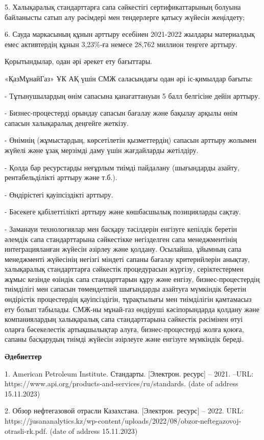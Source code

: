 5. Халықаралық стандарттарға сапа сәйкестігі сертификаттарының болуына
байланысты сатып алу рәсімдері мен тендерлерге қатысу жүйесін жеңілдету;

6. Сауда маркасының құнын арттыру есебінен 2021-2022 жылдары материалдық
емес активтердің құнын 3,23\%-ға немесе 28,762 миллион теңгеге арттыру.

Қорытындылар, одан әрі әрекет ету бағыттары.

«ҚазМұнайГаз» ҰК АҚ үшін СМЖ саласындағы одан әрі іс-қимылдар бағыты:

- Тұтынушылардың өнім сапасына қанағаттануын 5 балл белгісіне дейін
арттыру.

- Бизнес-процестерді орындау сапасын бағалау және бақылау арқылы өнім
сапасын халықаралық деңгейге жеткізу.

- Өнімнің (жұмыстардың, көрсетілетін қызметтердің) сапасын арттыру
жолымен жүйелі және ұзақ мерзімді даму үшін жағдайларды жетілдіру.

- Қолда бар ресурстарды неғұрлым тиімді пайдалану (шығындарды азайту,
рентабельділікті арттыру және т.б.).

- Өндірістегі қауіпсіздікті арттыру.

- Бәсекеге қабілеттілікті арттыру және көшбасшылық позицияларды сақтау.

- Заманауи технологиялар мен басқару тәсілдерін енгізуге кепілдік
беретін әлемдік сапа стандарттарына сәйкестікке негізделген сапа
менеджментінің интеграцияланған жүйесін әзірлеу және қолдану. Осылайша,
ұйымның сапа менеджменті жүйесінің негізгі міндеті сапаны бағалау
критерийлерін анықтау, халықаралық стандарттарға сәйкестік процедурасын
жүргізу, серіктестермен жұмыс кезінде өзіндік сапа стандарттарын құру
және енгізу, бизнес-процестердің тиімділігі мен сапасын төмендетпей
шығындарды азайтуға мүмкіндік беретін өндірістік процестердің
қауіпсіздігін, тұрақтылығы мен тиімділігін қамтамасыз ету болып
табылады. СМЖ-ны мұнай-газ өндіруші кәсіпорындарда қолдану және
компаниялардың халықаралық сапа стандарттарына сәйкестік рәсімінен өтуі
оларға бәсекелестік артықшылықтар алуға, бизнес-процестерді жолға қоюға,
сапаны басқарудың тиімді жүйесін әзірлеуге және енгізуге мүмкіндік
береді.

{\bfseries Әдебиеттер}

1. American Petroleum Institute. Стандарты. {[}Электрон. ресурс{]} --
2021. --URL: https://www.api.org/products-and-services/ru/standards.
(date of address 15.11.2023)

2. Обзор нефтегазовой отрасли Казахстана. {[}Электрон. ресурс{]} --
2022. URL:
https://jusananalytics.kz/wp-content/uploads/2022/08/obzor-neftegazovoj-otrasli-rk.pdf.
(date of address 15.11.2023)

